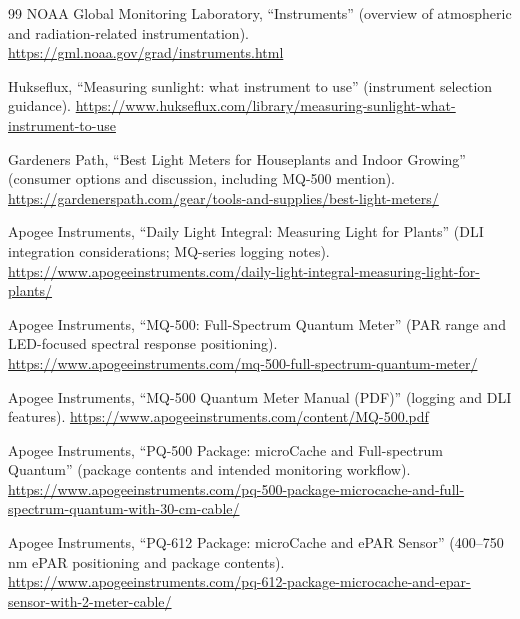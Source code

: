 \documentclass[11pt]{article}
\begin{document}
\begin{thebibliography}{99}
NOAA Global Monitoring Laboratory, ``Instruments'' (overview of atmospheric and radiation-related instrumentation).
\href{https://gml.noaa.gov/grad/instruments.html}{https://gml.noaa.gov/grad/instruments.html}

Hukseflux, ``Measuring sunlight: what instrument to use'' (instrument selection guidance).
\href{https://www.hukseflux.com/library/measuring-sunlight-what-instrument-to-use}{https://www.hukseflux.com/library/measuring-sunlight-what-instrument-to-use}

Gardeners Path, ``Best Light Meters for Houseplants and Indoor Growing'' (consumer options and discussion, including MQ-500 mention).
\href{https://gardenerspath.com/gear/tools-and-supplies/best-light-meters/}{https://gardenerspath.com/gear/tools-and-supplies/best-light-meters/}

Apogee Instruments, ``Daily Light Integral: Measuring Light for Plants'' (DLI integration considerations; MQ-series logging notes).
\href{https://www.apogeeinstruments.com/daily-light-integral-measuring-light-for-plants/}{https://www.apogeeinstruments.com/daily-light-integral-measuring-light-for-plants/}

Apogee Instruments, ``MQ-500: Full-Spectrum Quantum Meter'' (PAR range and LED-focused spectral response positioning).
\href{https://www.apogeeinstruments.com/mq-500-full-spectrum-quantum-meter/}{https://www.apogeeinstruments.com/mq-500-full-spectrum-quantum-meter/}

Apogee Instruments, ``MQ-500 Quantum Meter Manual (PDF)'' (logging and DLI features).
\href{https://www.apogeeinstruments.com/content/MQ-500.pdf}{https://www.apogeeinstruments.com/content/MQ-500.pdf}

Apogee Instruments, ``PQ-500 Package: microCache and Full-spectrum Quantum'' (package contents and intended monitoring workflow).
\href{https://www.apogeeinstruments.com/pq-500-package-microcache-and-full-spectrum-quantum-with-30-cm-cable/}{https://www.apogeeinstruments.com/pq-500-package-microcache-and-full-spectrum-quantum-with-30-cm-cable/}

Apogee Instruments, ``PQ-612 Package: microCache and ePAR Sensor'' (400--750 nm ePAR positioning and package contents).
\href{https://www.apogeeinstruments.com/pq-612-package-microcache-and-epar-sensor-with-2-meter-cable/}{https://www.apogeeinstruments.com/pq-612-package-microcache-and-epar-sensor-with-2-meter-cable/}


\end{thebibliography}
\end{document}
